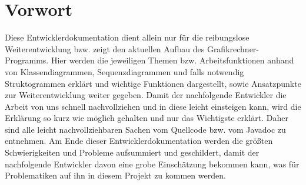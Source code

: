 
\ihead{\headmark}
\cfoot{\pagemark}


\section{Vorwort}
Diese Entwicklerdokumentation dient allein nur für die reibungslose Weiterentwicklung bzw. zeigt den aktuellen Aufbau des Grafikrechner-Programms. 
\newline
Hier werden die jeweiligen Themen bzw. Arbeitsfunktionen anhand von Klassendiagrammen, Sequenzdiagrammen und falls notwendig Struktogrammen erklärt und wichtige Funktionen dargestellt, sowie Ansatzpunkte zur Weiterentwicklung weiter gegeben. Damit der nachfolgende Entwickler die Arbeit von uns  schnell nachvollziehen und in diese leicht einsteigen kann, wird die Erklärung so kurz wie möglich gehalten und nur das Wichtigste erklärt. Daher sind alle leicht nachvollziehbaren Sachen vom Quellcode bzw. vom Javadoc zu entnehmen. 
Am Ende dieser Entwicklerdokumentation werden die größten Schwierigkeiten und Probleme aufsummiert und geschildert, damit der nachfolgende Entwickler davon eine grobe Einschätzung bekommen kann, was für Problematiken auf ihn in diesem Projekt zu kommen werden.




\newpage
